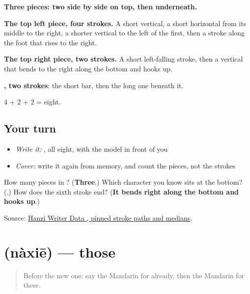 \begin{quote}
\end{quote}

\textbf{Three pieces: two side by side on top, then  underneath.}

\textbf{The top left piece, four strokes.} A short vertical, a short horizontal from its middle to the right, a shorter vertical to the left of the first, then a stroke along the foot that rises to the right.

\textbf{The top right piece, two strokes.} A short left-falling stroke, then a vertical that bends to the right along the bottom and hooks up.

\textbf{, two strokes}: the short bar, then the long one beneath it.

4 + 2 + 2 = eight.

\subsection*{Your turn}
\begin{itemize}
\raggedright
  \item \emph{Write it:} , all eight, with the model in front of you
  \item \emph{Cover:} write it again from memory, and count the pieces, not the strokes
\end{itemize}

\begin{tcolorbox}[breakable,colback=teal!4,colframe=teal!35!black,title={Before you move on}]
How many pieces in ? (\textbf{Three}.) Which character you know sits at the bottom? (\textbf{}.) How does the sixth stroke end? (\textbf{It bends right along the bottom and hooks up}.)

Source: \href{https://raw.githubusercontent.com/chanind/hanzi-writer-data/68d10a4b21150cae5e1ebbd223eed289cf32d90c/data/\%E4\%BA\%9B.json}{Hanzi Writer Data , pinned stroke paths and medians}.
\end{tcolorbox}
\section[\texorpdfstring{\zh{那些} (nàxiē)}{那些 (nàxiē)}]{ (nàxiē) — those}

\label{lesson:ZH-C127-naxie}



\begin{quote}
Before the new one: say the Mandarin for already, then the Mandarin for these.
\end{quote}

